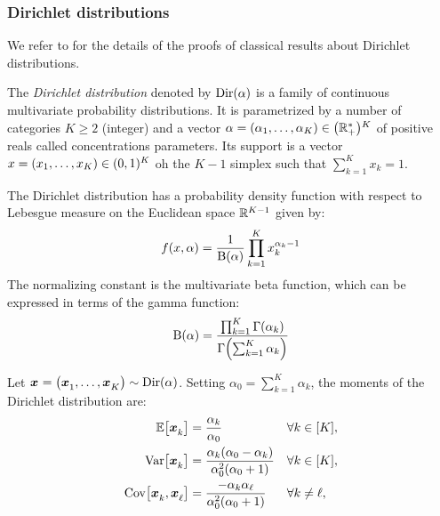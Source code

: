 \subsubsection{Dirichlet distributions}

We refer to \cite[Chapter 49]{Kotz2000} for the details of the proofs of classical results about Dirichlet distributions.

The \emph{Dirichlet distribution} denoted by $\mathrm{Dir}(\alpha)$ is a family of continuous multivariate probability distributions.
It is parametrized by a number of categories $K \ge 2$ (integer) and a vector $\alpha=\bracket{\alpha_1,\ldots,\alpha_K}\in\bracket{\RR_+^*}^K$ of positive reals called concentrations parameters.
Its support is a vector $x=\bracket{x_1,\ldots,x_K}\in\bracket{0,1}^K$ oh the $K-1$ simplex \ie such that $\sum_{k=1}^K x_k = 1$.

The Dirichlet distribution has a probability density function with respect to Lebesgue measure on the Euclidean space $\mathbb{R}^{K-1}$ given by:
\begin{equation}\label{eq:dirchlet:probability-density-function}
  f\bracket{x,\alpha} = \frac{1}{ \Beta\bracket{\alpha}}\prod_{k=1}^K x_k^{\alpha_k-1}
\end{equation}
The normalizing constant is the multivariate beta function, which can be expressed in terms of the gamma function:
\begin{equation}
  \Beta\bracket{\alpha} =
  \frac{ \prod_{k=1}^K \Gamma\bracket{\alpha_k} }
       { \Gamma\bracket{\sum_{k=1}^K \alpha_k} }
\end{equation}


Let $\va x=\bracket{\va x_1,\ldots,\va x_K}\sim \Dir\bracket{\alpha}$. Setting $\alpha_0=\sum_{k=1}^K\alpha_k$, the moments of the Dirichlet distribution are:
\begin{subequations}\label{eq:dirchlet:moments}
  \begin{align}
    \espe\sqbracket{\va x_k} &= \frac{\alpha_k}{\alpha_0} && \forall k\in\range{K},
    \label{eq:dirchlet:moments:mean}
    \\
    \vari\sqbracket{\va x_k} &= \frac{\alpha_k\bracket{\alpha_0-\alpha_k}}{\alpha_0^2\bracket{\alpha_0+1}} && \forall k\in\range{K},
    \label{eq:dirchlet:moments:mean}
    \\
    \cova\sqbracket{\va x_k,\va x_{\ell}} &= \frac{-\alpha_k\alpha_{\ell}}{\alpha_0^2\bracket{\alpha_0+1}} && \forall k\ne\ell,
    \label{eq:dirchlet:moments:mean}
  \end{align}
\end{subequations}


